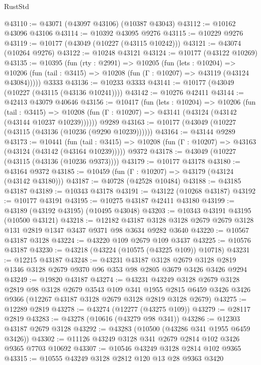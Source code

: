 \begin{lexlean}{RustStd}
\begin{coremodule}
@43110 := @43071 (@43097 @43106) (@10387 @43043)
@43112 := @10162 @43096 @43106
@43114 := @10392 @43095 @9276
@43115 := @10229 @9276
@43119 := @10177 (@43049 (@10227 (@43115 @10242)))
@43121 := @43074 (@10264 @9276)
@43122 := @10248 @43121
@43124 := @10177 (@43122 @10269)
@43135 := @10395
    (fun (rty : @2991) =>
    @10205
      (fun (lets : @10204) =>
      @10206 (fun (tail : @3415) => @10208 (fun (Γ : @10207) => @43119 (@43124 @43084)))))
    @3333
@43136 := @10233 @3333
@43141 := @10177 (@43049 (@10227 (@43115 (@43136 @10241))))
@43142 := @10276 @42411
@43144 := @42413 @43079 @40646
@43156 := @10417
    (fun (lets : @10204) =>
    @10206
      (fun (tail : @3415) =>
      @10208 (fun (Γ : @10207) => @43141 (@43124 (@43142 (@43144 @10237 @10239))))))
    @9289
@43163 := @10177 (@43049 (@10227 (@43115 (@43136 (@10236 (@9290 @10239))))))
@43164 := @43144 @9289
@43173 := @10441
    (fun (tail : @3415) => @10208 (fun (Γ : @10207) => @43163 (@43124 (@43142 (@43164 @10239)))))
    @9372
@43178 := @43049 (@10227 (@43115 (@43136 (@10236 @9373))))
@43179 := @10177 @43178
@43180 := @43164 @9372
@43185 := @10459 (fun (Γ : @10207) => @43179 (@43124 (@43142 @43180)))
@43187 := @40728 (@42528 @10484)
@43188 := @43185 @43187
@43189 := @10343 @43178
@43191 := @43122 (@10268 @43187)
@43192 := @10177 @43191
@43195 := @10275 @43187 @42411 @43180
@43199 := @43189 (@43192 @43195) (@10495 @43048)
@43203 := @10343 @43191 @43195 (@10500 @43121)
@43218 := @12182
    @43187
    @3128
    @3128
    @2679
    @2679
    @3128
    @131
    @2819
    @1347
    @3437
    @9371
    @98
    @3634
    @9282
    @3640
@43220 := @10567 @43187 @3128
@43224 := @43220 @109 @2679 @109 @3437
@43225 := @10576 @43187
@43230 := @43218 (@43224 (@10575 (@43225 @109)) @10718)
@43231 := @12215 @43187
@43248 := @43231
    @43187
    @3128
    @2679
    @3128
    @2819
    @1346
    @3128
    @2679
    @9370
    @96
    @353
    @98
    @2805
    @3679
    @3426
    @3426
    @9294
@43249 := @19820 @43187
@43274 := @43231
    @43249
    @3128
    @2679
    @3128
    @2819
    @98
    @3128
    @2679
    @3543
    @109
    @341
    @1955
    @2815
    @6459
    @3426
    @3426
    @9366
    (@12267 @43187 @3128 @2679 @3128 @2819 @3128 @2679)
@43275 := @12289 @2819
@43278 := @43274 (@12277 (@43275 @109))
@43279 := @28117 @2819
@43283 := @43278 (@10616 (@43279 @98 @341))
@43286 := @12303 @43187 @2679 @3128
@43292 := @43283 (@10500 (@43286 @341 @1955 @6459 @3426))
@43302 := @11126 @43249 @3128 @341 @2679 @2814 @102 @3426 @9365 @7703 @10692
@43307 := @10546 @43249 @3128 @2814 @102 @9365
@43315 := @10555 @43249 @3128 @2812 @120 @13 @28 @9363 @3420

\end{coremodule}
\end{lexlean}
